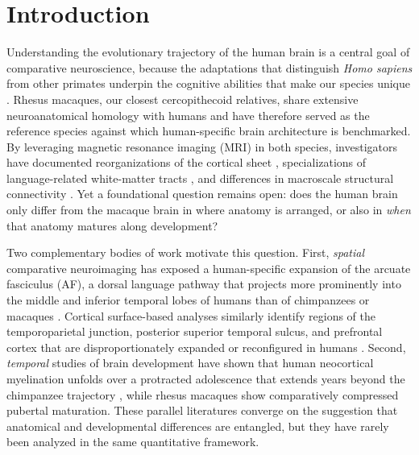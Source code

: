\section{Introduction}

Understanding the evolutionary trajectory of the human brain is a central goal of comparative neuroscience, because the adaptations that distinguish \textit{Homo sapiens} from other primates underpin the cognitive abilities that make our species unique \cite{rilling2014comparative, sherwood2013whats}. Rhesus macaques, our closest cercopithecoid relatives, share extensive neuroanatomical homology with humans and have therefore served as the reference species against which human-specific brain architecture is benchmarked. By leveraging magnetic resonance imaging (MRI) in both species, investigators have documented reorganizations of the cortical sheet \cite{hill2010similar, smaers2019brain}, specializations of language-related white-matter tracts \cite{rilling2008evolution, eichert2019special, balezeau2020primate}, and differences in macroscale structural connectivity \cite{goulas2014comparative}. Yet a foundational question remains open: does the human brain only differ from the macaque brain in where anatomy is arranged, or also in \textit{when} that anatomy matures along development?

Two complementary bodies of work motivate this question. First, \textit{spatial} comparative neuroimaging has exposed a human-specific expansion of the arcuate fasciculus (AF), a dorsal language pathway that projects more prominently into the middle and inferior temporal lobes of humans than of chimpanzees or macaques \cite{rilling2008evolution, rilling2012continuity, catani2008arcuate}. Cortical surface-based analyses similarly identify regions of the temporoparietal junction, posterior superior temporal sulcus, and prefrontal cortex that are disproportionately expanded or reconfigured in humans \cite{hill2010similar, patel2019temporoparietal, smaers2011primate}. Second, \textit{temporal} studies of brain development have shown that human neocortical myelination unfolds over a protracted adolescence that extends years beyond the chimpanzee trajectory \cite{miller2012prolonged, perrin2009sex, dubois2014early}, while rhesus macaques show comparatively compressed pubertal maturation. These parallel literatures converge on the suggestion that anatomical and developmental differences are entangled, but they have rarely been analyzed in the same quantitative framework.

